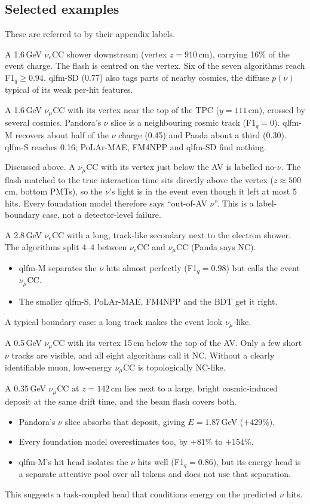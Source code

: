 \documentclass[11pt,a4paper]{article}
\newcommand{\nue}{\ensuremath{\nu_e}}
\newcommand{\numu}{\ensuremath{\nu_\mu}}
\begin{document}
\subsection{Selected examples}
These are referred to by their appendix labels.
\begin{description}[leftmargin=1.2em]
\item[T1 easy \#1] A 1.6\,GeV \nue CC shower downstream (vertex $z=910$\,cm), carrying 16\% of the event charge. The flash is centred on the vertex. Six of the seven algorithms reach F1$_q\geq0.94$. qlfm-SD (0.77) also tags parts of nearby cosmics, the diffuse $p(\nu)$ typical of its weak per-hit features.
\item[T1 hard \#7] A 1.6\,GeV \numu CC with its vertex near the top of the TPC ($y=111$\,cm), crossed by several cosmics. Pandora's $\nu$ slice is a neighbouring cosmic track (F1$_q=0$). qlfm-M recovers about half of the $\nu$ charge (0.45) and Panda about a third (0.30). qlfm-S reaches 0.16; PoLAr-MAE, FM4NPP and qlfm-SD find nothing.
\item[T2 hard \#1] Discussed above. A \numu CC with its vertex just below the AV is labelled no-$\nu$. The flash matched to the true interaction time sits directly above the vertex ($z\approx500$\,cm, bottom PMTs), so the $\nu$'s light is in the event even though it left at most 5 hits. Every foundation model therefore says ``out-of-AV $\nu$''. This is a label-boundary case, not a detector-level failure.
\item[T3 boundary \#2] A 2.8\,GeV \nue CC with a long, track-like secondary next to the electron shower. The algorithms split 4--4 between \nue CC and \numu CC (Panda says NC).
  \begin{itemize}
    \item qlfm-M separates the $\nu$ hits almost perfectly (F1$_q=0.98$) but calls the event \numu CC.
    \item The smaller qlfm-S, PoLAr-MAE, FM4NPP and the BDT get it right.
  \end{itemize}
  A typical boundary case: a long track makes the event look \numu-like.
\item[T3 hard \#1] A 0.5\,GeV \numu CC with its vertex 15\,cm below the top of the AV. Only a few short $\nu$ tracks are visible, and all eight algorithms call it NC. Without a clearly identifiable muon, low-energy \numu CC is topologically NC-like.
\item[T4 hard \#4] A 0.35\,GeV \numu CC at $z=142$\,cm lies next to a large, bright cosmic-induced deposit at the same drift time, and the beam flash covers both.
  \begin{itemize}
    \item Pandora's $\nu$ slice absorbs that deposit, giving $E=1.87$\,GeV ($+429$\%).
    \item Every foundation model overestimates too, by $+81$\% to $+154$\%.
    \item qlfm-M's hit head isolates the $\nu$ hits well (F1$_q=0.86$), but its energy head is a separate attentive pool over all tokens and does not use that separation.
  \end{itemize}
  This suggests a task-coupled head that conditions energy on the predicted $\nu$ hits.
\end{description}
\end{document}
